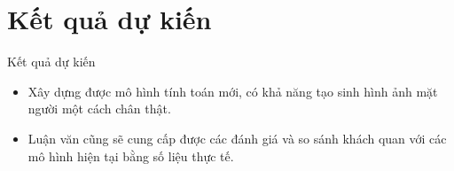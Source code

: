 \section{Kết quả dự kiến}\label{sec:intro}
\frame{\tableofcontents[currentsection]}
\begin{frame}{Kết quả dự kiến}

\begin{itemize}
    \item <1-> Xây dựng được mô hình tính toán mới, có khả năng tạo sinh hình ảnh mặt người một cách chân thật.
    \item <2-> Luận văn cũng sẽ cung cấp được các đánh giá và so sánh khách quan với các mô hình hiện tại bằng số liệu thực tế.
\end{itemize}
\end{frame}
